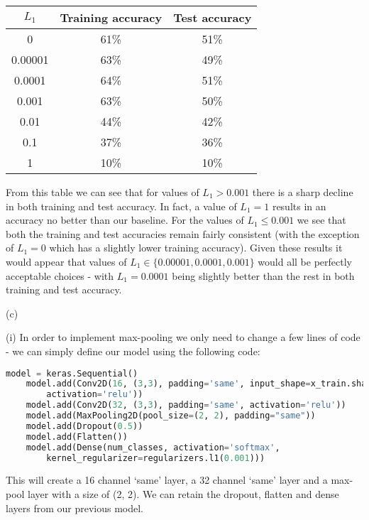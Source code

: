 \documentclass[12pt]{article}
\begin{document}
\begin{center}
    \begin{tabular}{|c|c|c|}
        \hline
        $L_1$ & Training accuracy & Test accuracy \\ \hline
        0 & 61\% & 51\% \\
        0.00001 & 63\% & 49\% \\
        0.0001 & 64\% & 51\% \\
        0.001 & 63\% & 50\% \\
        0.01 & 44\% & 42\% \\
        0.1 & 37\% & 36\% \\
        1 & 10\% & 10\% \\
        \hline
    \end{tabular}
\end{center}

From this table we can see that for values of $L_1 > 0.001$ there is a sharp decline in both training and test accuracy. In fact, a value of $L_1 = 1$ results in an accuracy no better than our baseline. For the values of $L_1 \le 0.001$ we see that both the training and test accuracies remain fairly consistent (with the exception of $L_1 = 0$ which has a slightly lower training accuracy). Given these results it would appear that values of $L_1 \in \{ 0.00001, 0.0001, 0.001 \}$ would all be perfectly acceptable choices - with $L_1 = 0.0001$ being slightly better than the rest in both training and test accuracy.

\noindent (c)

\indent (i) In order to implement max-pooling we only need to change a few lines of code - we can simply define our model using the following code:

\begin{center}
    \lstset{basicstyle=\footnotesize}
    \begin{lstlisting}[language=Python]
    model = keras.Sequential()
    model.add(Conv2D(16, (3,3), padding='same', input_shape=x_train.shape[1:],
        activation='relu'))
    model.add(Conv2D(32, (3,3), padding='same', activation='relu'))
    model.add(MaxPooling2D(pool_size=(2, 2), padding="same"))
    model.add(Dropout(0.5))
    model.add(Flatten())
    model.add(Dense(num_classes, activation='softmax',
        kernel_regularizer=regularizers.l1(0.001)))
    \end{lstlisting}
\end{center}

This will create a 16 channel `same' layer, a 32 channel `same' layer and a max-pool layer with a size of (2, 2). We can retain the dropout, flatten and dense layers from our previous model.
\end{document}
